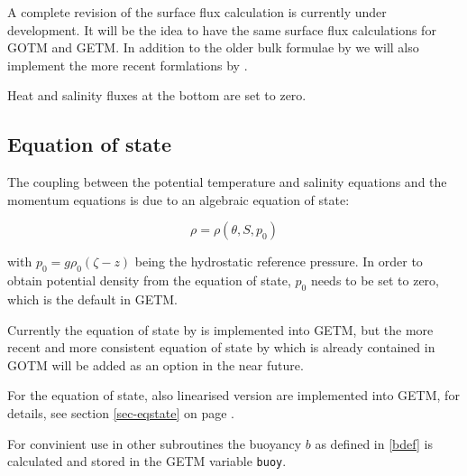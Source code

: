 A complete revision of the surface flux calculation is currently under
development. It will be the idea to have the same surface flux calculations
for GOTM and GETM. In addition to the older bulk formulae by \cite{KONDO75}
we will also implement the more recent formlations by 
\cite{FAIRALLea96}.

Heat and salinity fluxes at the bottom are set to zero. 

\subsection{Equation of state}\label{Section_state_eq}

The coupling between the potential temperature and salinity 
equations and the momentum
equations is due to an algebraic equation of state:

\begin{equation}\label{UNESCO} 
\rho=\rho(\theta,S,p_0)
\end{equation}

with $p_0=g\rho_0(\zeta-z)$ being the hydrostatic reference pressure.
In order to obtain potential density from the equation of state, 
$p_0$ needs to be set to zero, which is the default in GETM.

Currently the equation of state by \cite{FOFONOFFea83} is implemented
into GETM, but the more recent and more consistent equation of state
by \cite{JACKETTea05} which is already contained in GOTM
will be added as an option in the near future.

For the equation of state, also linearised version are implemented into
GETM, for details, see section \ref{sec-eqstate} on page \pageref{sec-eqstate}.

For convinient use in other subroutines the buoyancy $b$ as defined in 
\eqref{bdef} is calculated and stored in the GETM variable {\tt buoy}.

